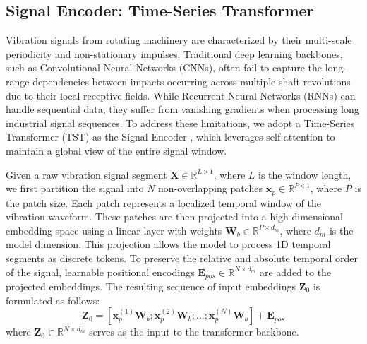 \documentclass[journal]{IEEEtran}
\begin{document}
\subsection{Signal Encoder: Time-Series Transformer}
Vibration signals from rotating machinery are characterized by their multi-scale periodicity and non-stationary impulses. Traditional deep learning backbones, such as Convolutional Neural Networks (CNNs), often fail to capture the long-range dependencies between impacts occurring across multiple shaft revolutions due to their local receptive fields. While Recurrent Neural Networks (RNNs) can handle sequential data, they suffer from vanishing gradients when processing long industrial signal sequences. To address these limitations, we adopt a Time-Series Transformer (TST) as the Signal Encoder \cite{zerveas2021transformer}, which leverages self-attention to maintain a global view of the entire signal window.

Given a raw vibration signal segment $\mathbf{X} \in \mathbb{R}^{L \times 1}$, where $L$ is the window length, we first partition the signal into $N$ non-overlapping patches $\mathbf{x}_p \in \mathbb{R}^{P \times 1}$, where $P$ is the patch size. Each patch represents a localized temporal window of the vibration waveform. These patches are then projected into a high-dimensional embedding space using a linear layer with weights $\mathbf{W}_b \in \mathbb{R}^{P \times d_m}$, where $d_m$ is the model dimension. This projection allows the model to process 1D temporal segments as discrete tokens. To preserve the relative and absolute temporal order of the signal, learnable positional encodings $\mathbf{E}_{pos} \in \mathbb{R}^{N \times d_m}$ are added to the projected embeddings. The resulting sequence of input embeddings $\mathbf{Z}_0$ is formulated as follows:
\begin{equation}
\mathbf{Z}_0 = [\mathbf{x}_p^{(1)}\mathbf{W}_b; \mathbf{x}_p^{(2)}\mathbf{W}_b; \dots; \mathbf{x}_p^{(N)}\mathbf{W}_b] + \mathbf{E}_{pos}
\end{equation}
where $\mathbf{Z}_0 \in \mathbb{R}^{N \times d_m}$ serves as the input to the transformer backbone.
\end{document}
